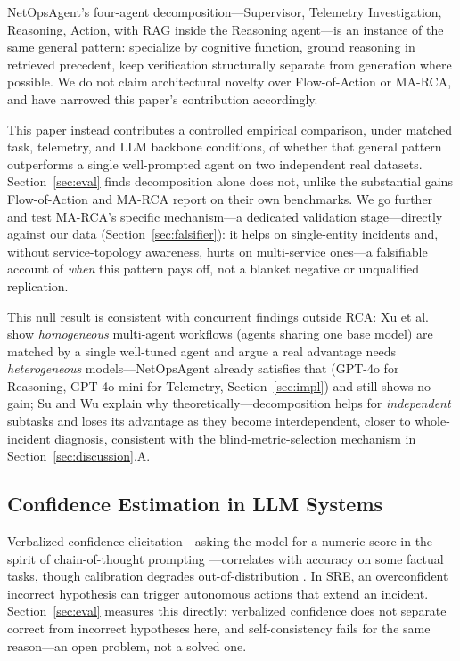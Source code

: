 \documentclass[10pt,conference]{IEEEtran}
\begin{document}
NetOpsAgent's four-agent decomposition---Supervisor, Telemetry
Investigation, Reasoning, Action, with RAG inside the Reasoning agent---is
an instance of the same general pattern: specialize by cognitive function,
ground reasoning in retrieved precedent, keep verification structurally
separate from generation where possible. We do not claim architectural
novelty over Flow-of-Action or MA-RCA, and have narrowed this paper's
contribution accordingly.

This paper instead contributes a controlled empirical comparison, under
matched task, telemetry, and LLM backbone conditions, of whether that
general pattern outperforms a single well-prompted agent on two
independent real datasets. Section~\ref{sec:eval} finds decomposition
alone does not, unlike the substantial gains Flow-of-Action and MA-RCA
report on their own benchmarks. We go further and test MA-RCA's specific
mechanism---a dedicated validation stage---directly against our data
(Section~\ref{sec:falsifier}): it helps on single-entity incidents and,
without service-topology awareness, hurts on multi-service ones---a
falsifiable account of \emph{when} this pattern pays off, not a blanket
negative or unqualified replication.

This null result is consistent with concurrent findings outside RCA: Xu et
al.\ \cite{xu2026rethinking} show \emph{homogeneous} multi-agent
workflows (agents sharing one base model) are matched by a single
well-tuned agent and argue a real advantage needs \emph{heterogeneous}
models---NetOpsAgent already satisfies that (GPT-4o for Reasoning,
GPT-4o-mini for Telemetry, Section~\ref{sec:impl}) and still shows no gain;
Su and Wu \cite{su2026outperform} explain why theoretically---decomposition
helps for \emph{independent} subtasks and loses its advantage as they
become interdependent, closer to whole-incident diagnosis, consistent with
the blind-metric-selection mechanism in Section~\ref{sec:discussion}.A.

\subsection{Confidence Estimation in LLM Systems}
Verbalized confidence elicitation---asking the model for a numeric score
in the spirit of chain-of-thought prompting \cite{wei2022cot}---correlates
with accuracy on some factual tasks, though calibration degrades
out-of-distribution \cite{guo2017calibration}. In SRE, an overconfident
incorrect hypothesis can trigger autonomous actions that extend an
incident. Section~\ref{sec:eval} measures this directly: verbalized
confidence does not separate correct from incorrect hypotheses here, and
self-consistency fails for the same reason---an open problem, not a solved
one.
\end{document}
